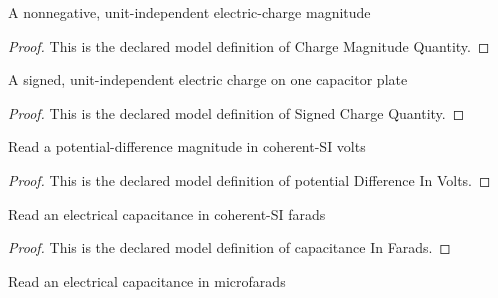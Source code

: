 \begin{definition}
  \label{def:physics:phyx-mini-0879:phyxminiproblems-problemphyxmini0879-chargemagnitudequantity}
  A nonnegative, unit-independent electric-charge magnitude
\end{definition}
\begin{proof}
  This is the declared model definition of Charge Magnitude Quantity.
\end{proof}
\begin{definition}
  \label{def:physics:phyx-mini-0879:phyxminiproblems-problemphyxmini0879-signedchargequantity}
  A signed, unit-independent electric charge on one capacitor plate
\end{definition}
\begin{proof}
  This is the declared model definition of Signed Charge Quantity.
\end{proof}
\begin{definition}
  \label{def:physics:phyx-mini-0879:phyxminiproblems-problemphyxmini0879-potentialdifferenceinvolts}
  Read a potential-difference magnitude in coherent-SI volts
\end{definition}
\begin{proof}
  This is the declared model definition of potential Difference In Volts.
\end{proof}
\begin{definition}
  \label{def:physics:phyx-mini-0879:phyxminiproblems-problemphyxmini0879-capacitanceinfarads}
  Read an electrical capacitance in coherent-SI farads
\end{definition}
\begin{proof}
  This is the declared model definition of capacitance In Farads.
\end{proof}
\begin{definition}
  \label{def:physics:phyx-mini-0879:phyxminiproblems-problemphyxmini0879-capacitanceinmicrofarads}
  Read an electrical capacitance in microfarads
\end{definition}
